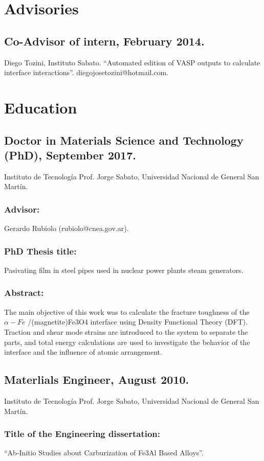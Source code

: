 \documentclass{my_cv}
\begin{document}
\section{Advisories}

\subsection{ Co-Advisor of intern, February 2014.} Diego Tozini, Instituto Sabato. “Automated edition
of VASP outputs to calculate interface interactions”. diegojosetozini@hotmail.com.

\section{Education}

\subsection{Doctor in Materials Science and Technology (PhD), September 2017.} Instituto de
Tecnología Prof. Jorge Sabato, Universidad Nacional de General San Martín. \subsubsection{Advisor:}
Gerardo Rubiolo (rubiolo@cnea.gov.ar).
\subsubsection{PhD Thesis title:} Pasivating film in steel pipes used in nuclear power plants steam
generators.
\subsubsection{Abstract:} The main objective of this work was to calculate the fracture toughness of the $\alpha-Fe$ /(magnetite)Fe3O4 interface using Density Functional Theory (DFT). Traction and
shear mode strains are introduced to the system to separate the parts, and total energy
calculations are used to investigate the behavior of the interface and the influence of
atomic arrangement.

\subsection{Materlials Engineer, August 2010.} Instituto de Tecnología Prof. Jorge Sabato,
Universidad Nacional de General San Martín.
\subsubsection{Title of the Engineering dissertation:} “Ab-Initio Studies about Carburization of Fe3Al Based Alloys”.
\end{document}
